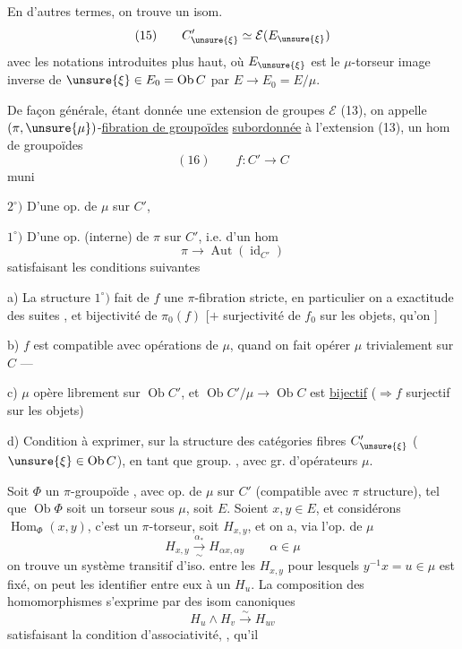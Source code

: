 En d'autres termes, on trouve un isom.
\[
(15)\qquad C'_{\unsure{\xi}}\simeq\mathcal E(E_{\unsure{\xi}})
\]
avec les notations introduites plus haut,
où $E_{\unsure{\xi}}$ est le $\mu$-torseur image inverse de
$\unsure{\xi}\in E_0=\operatorname{Ob}C$ par $E\longrightarrow E_0=E/\mu$.

De façon générale, étant donnée une
extension  de groupes  $\mathcal E$
(13), on appelle $(\pi,\unsure{\mu})$-\uline{fibration  de groupoïdes}
\uline{subordonnée} à l'extension (13), un
hom de groupoïdes
\[
(16)\qquad f:C'\longrightarrow C
\]
muni

$2^\circ)$ D'une op.  de $\mu$ sur $C'$,
 

$1^\circ)$ D'une op. (interne) de $\pi$ sur $C'$, i.e.
d'un hom
\[
\pi\longrightarrow\operatorname{Aut}(\operatorname{id}_{C'})
\]
satisfaisant les conditions suivantes

a) La structure $1^\circ)$ fait de $f$ une $\pi$-fibration
stricte, en particulier on a exactitude des suites
, et bijectivité de $\pi_0(f)$
[$+$ surjectivité de $f_0$
sur les objets, qu'on ]

b)  $f$ est compatible avec opérations de $\mu$,
quand on fait opérer $\mu$ trivialement sur $C$ ---

c) $\mu$ opère librement sur $\operatorname{Ob}C'$, et
$\operatorname{Ob}C'/\mu\longrightarrow\operatorname{Ob}C$
est \uline{bijectif} ($\Rightarrow f$ surjectif sur les objets)

d)  Condition à exprimer, sur la
structure des catégories fibres $C'_{\unsure{\xi}}$ ($\unsure{\xi}\in\operatorname{Ob}C$),
en tant que \inserted{$\pi$-}group. , avec gr.
d'opérateurs $\mu$.

Soit $\Phi$  un $\pi$-groupoïde , avec op.
de $\mu$ sur $C'$ (compatible avec $\pi$
structure), tel que $\operatorname{Ob}\Phi$ soit un
torseur sous $\mu$, soit $E$. Soient $x,y\in E$,
et considérons $\operatorname{Hom}_{\Phi}(x,y)$, c'est un
$\pi$-torseur, soit $H_{x,y}$, et on a, via l'op.
de $\mu$
\[
H_{x,y}\xrightarrow[\sim]{\alpha_*}H_{\alpha x,\alpha y}
\qquad\alpha\in\mu
\]
on trouve un système transitif d'iso. entre
les $H_{x,y}$ pour lesquels $y^{-1}x=u\in\mu$
est fixé, on peut les identifier entre
eux à un $H_u$.  La composition
des homomorphismes s'exprime par des
isom canoniques
\[
H_u\mathbin{\wedge}H_v\xrightarrow{\sim}H_{uv}
\]
satisfaisant la condition d'associativité, , qu'il

